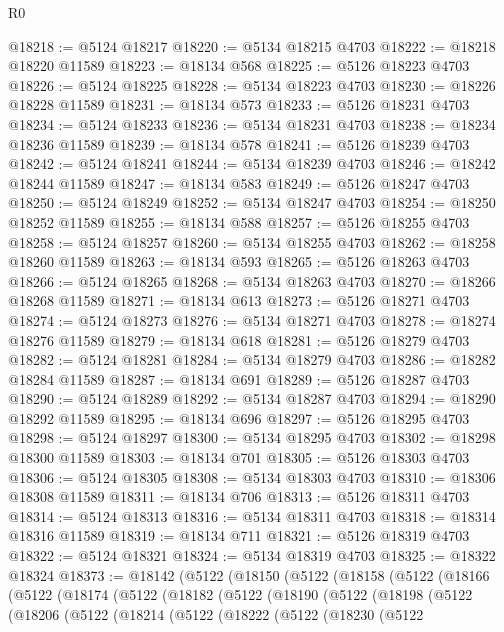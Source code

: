 \begin{lexlean}{R0}
\begin{coremodule}
@18218 := @5124 @18217
@18220 := @5134 @18215 @4703
@18222 := @18218 @18220 @11589
@18223 := @18134 @568
@18225 := @5126 @18223 @4703
@18226 := @5124 @18225
@18228 := @5134 @18223 @4703
@18230 := @18226 @18228 @11589
@18231 := @18134 @573
@18233 := @5126 @18231 @4703
@18234 := @5124 @18233
@18236 := @5134 @18231 @4703
@18238 := @18234 @18236 @11589
@18239 := @18134 @578
@18241 := @5126 @18239 @4703
@18242 := @5124 @18241
@18244 := @5134 @18239 @4703
@18246 := @18242 @18244 @11589
@18247 := @18134 @583
@18249 := @5126 @18247 @4703
@18250 := @5124 @18249
@18252 := @5134 @18247 @4703
@18254 := @18250 @18252 @11589
@18255 := @18134 @588
@18257 := @5126 @18255 @4703
@18258 := @5124 @18257
@18260 := @5134 @18255 @4703
@18262 := @18258 @18260 @11589
@18263 := @18134 @593
@18265 := @5126 @18263 @4703
@18266 := @5124 @18265
@18268 := @5134 @18263 @4703
@18270 := @18266 @18268 @11589
@18271 := @18134 @613
@18273 := @5126 @18271 @4703
@18274 := @5124 @18273
@18276 := @5134 @18271 @4703
@18278 := @18274 @18276 @11589
@18279 := @18134 @618
@18281 := @5126 @18279 @4703
@18282 := @5124 @18281
@18284 := @5134 @18279 @4703
@18286 := @18282 @18284 @11589
@18287 := @18134 @691
@18289 := @5126 @18287 @4703
@18290 := @5124 @18289
@18292 := @5134 @18287 @4703
@18294 := @18290 @18292 @11589
@18295 := @18134 @696
@18297 := @5126 @18295 @4703
@18298 := @5124 @18297
@18300 := @5134 @18295 @4703
@18302 := @18298 @18300 @11589
@18303 := @18134 @701
@18305 := @5126 @18303 @4703
@18306 := @5124 @18305
@18308 := @5134 @18303 @4703
@18310 := @18306 @18308 @11589
@18311 := @18134 @706
@18313 := @5126 @18311 @4703
@18314 := @5124 @18313
@18316 := @5134 @18311 @4703
@18318 := @18314 @18316 @11589
@18319 := @18134 @711
@18321 := @5126 @18319 @4703
@18322 := @5124 @18321
@18324 := @5134 @18319 @4703
@18325 := @18322 @18324
@18373 := @18142
    (@5122
      (@18150
        (@5122
          (@18158
            (@5122
              (@18166
                (@5122
                  (@18174
                    (@5122
                      (@18182
                        (@5122
                          (@18190
                            (@5122
                              (@18198
                                (@5122
                                  (@18206
                                    (@5122
                                      (@18214
                                        (@5122
                                          (@18222
                                            (@5122
                                              (@18230
                                                (@5122

\end{coremodule}
\end{lexlean}
